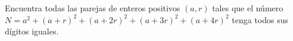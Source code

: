Encuentra todas las parejas de enteros positivos $(a, r)$ tales que el número $N = a^2 +(a+r)^2 +(a+2r)^2 +(a+3r)^2 +(a+4r)^2$ tenga todos sus dígitos iguales.